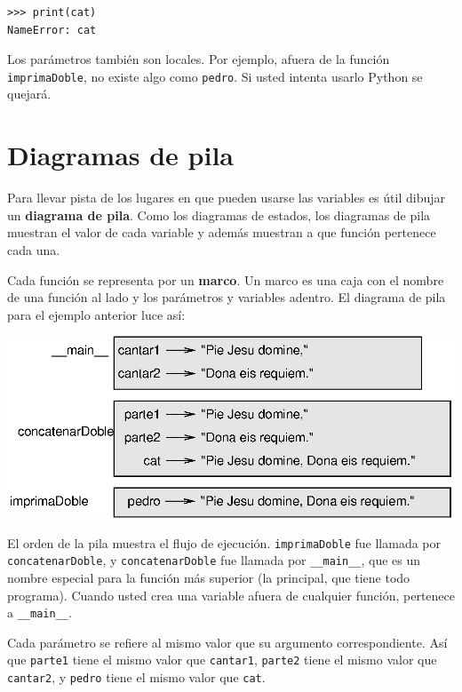 \begin{lstlisting}
>>> print(cat)
NameError: cat
\end{lstlisting}
 Los parámetros también son locales. Por ejemplo, afuera de la función
\texttt{imprimaDoble}, no existe algo como \texttt{pedro}. Si usted
intenta usarlo Python se quejará.

\section{Diagramas de pila}

\label{stackdiagram}  

Para llevar pista de los lugares en que pueden usarse las variables
es útil dibujar un \textbf{diagrama de pila}. Como los diagramas de
estados, los diagramas de pila muestran el valor de cada variable
y además muestran a que función pertenece cada una.

Cada función se representa por un \textbf{marco}. Un marco es una
caja con el nombre de una función al lado y los parámetros y variables
adentro. El diagrama de pila para el ejemplo anterior luce así:

 \beforefig \centerline{\includegraphics{illustrations/stack}}
\afterfig

El orden de la pila muestra el flujo de ejecución. \texttt{imprimaDoble}
fue llamada por \texttt{concatenarDoble}, y \texttt{concatenarDoble}
fue llamada por \texttt{\_\_main\_\_}, que es un nombre especial para
la función más superior (la principal, que tiene todo programa). Cuando
usted crea una variable afuera de cualquier función, pertenece a \texttt{\_\_main\_\_}.

Cada parámetro se refiere al mismo valor que su argumento correspondiente.
Así que \texttt{parte1} tiene el mismo valor que \texttt{cantar1},
\texttt{parte2} tiene el mismo valor que \texttt{cantar2}, y \texttt{pedro}
tiene el mismo valor que \texttt{cat}.

